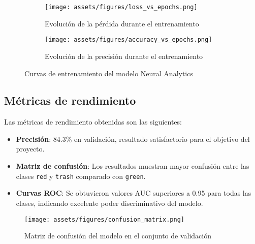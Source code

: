 \begin{figure}[ht]
    \centering
    \begin{subfigure}[b]{0.49\textwidth}
        \centering
        \texttt{[image: assets/figures/loss\_vs\_epochs.png]}
        \caption{Evolución de la pérdida durante el entrenamiento}
        \label{fig:loss_vs_epochs}
    \end{subfigure}
    \hfill
    \begin{subfigure}[b]{0.49\textwidth}
        \centering
        \texttt{[image: assets/figures/accuracy\_vs\_epochs.png]}
        \caption{Evolución de la precisión durante el entrenamiento}
        \label{fig:accuracy_vs_epochs}
    \end{subfigure}
    \caption{Curvas de entrenamiento del modelo Neural Analytics}
    \label{fig:training_curves}
\end{figure}

\newpage
\subsection{Métricas de rendimiento}

Las métricas de rendimiento obtenidas son las siguientes:

\begin{itemize}
    \item \textbf{Precisión}: 84.3\% en validación, resultado satisfactorio para el objetivo del proyecto.
    
    \item \textbf{Matriz de confusión}: Los resultados muestran mayor confusión entre las clases \texttt{red} y \texttt{trash} comparado con \texttt{green}.
    
    \item \textbf{Curvas ROC}: Se obtuvieron valores AUC superiores a 0.95 para todas las clases, indicando excelente poder discriminativo del modelo.
\end{itemize}

\begin{figure}[ht]
    \centering
    \texttt{[image: assets/figures/confusion\_matrix.png]}
    \caption{Matriz de confusión del modelo en el conjunto de validación}
    \label{fig:confusion_matrix}
\end{figure}

